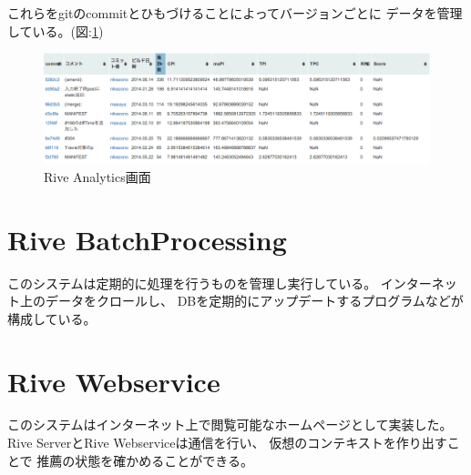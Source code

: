 これらをgitのcommitとひもづけることによってバージョンごとに
データを管理している。(図:\ref{fig:riveanalytics})
\begin{figure}[htbp]
  \begin{center}
    \includegraphics[width=170mm,bb=0 0 952 274]{images/riveanalytics.png}
    \caption{Rive Analytics画面}
    \label{fig:riveanalytics}
  \end{center}
\end{figure}

\section{Rive BatchProcessing}
このシステムは定期的に処理を行うものを管理し実行している。
インターネット上のデータをクロールし、
DBを定期的にアップデートするプログラムなどが構成している。

\section{Rive Webservice}
このシステムはインターネット上で閲覧可能なホームページとして実装した。
Rive ServerとRive Webserviceは通信を行い、
仮想のコンテキストを作り出すことで
推薦の状態を確かめることができる。

